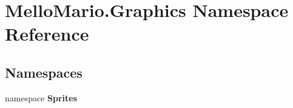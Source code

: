 \section{Mello\+Mario.\+Graphics Namespace Reference}
\label{namespaceMelloMario_1_1Graphics}
\subsection*{Namespaces}
\begin{DoxyCompactItemize}
\item 
namespace \textbf{ Sprites}
\end{DoxyCompactItemize}

